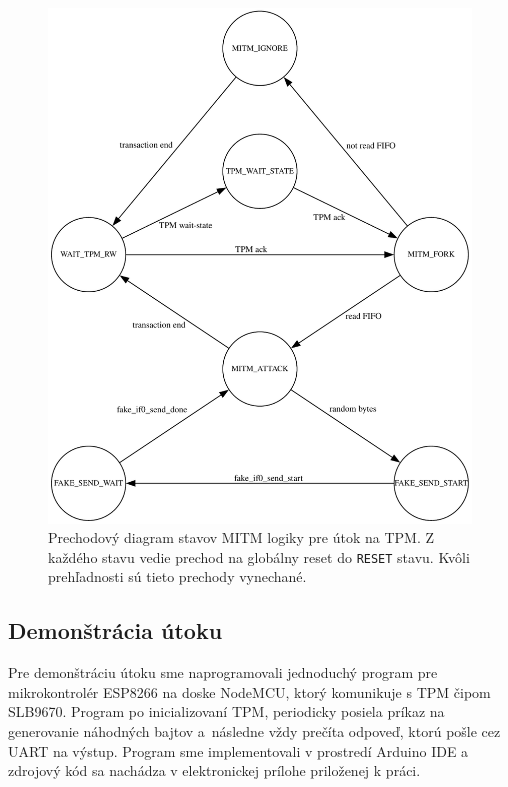 \begin{figure}
    \centerline{\includegraphics[width=1\textwidth]{images/misc/tpmMitmStateTransition.pdf}}
    \caption[Prechodový diagram stavov MITM logiky pre útok na TPM]{Prechodový diagram stavov MITM logiky pre útok na TPM. Z každého stavu vedie prechod na globálny reset do \texttt{RESET} stavu. Kvôli prehľadnosti sú tieto prechody vynechané.}
    \label{obr:tpmMitmStateTransition}
\end{figure}

\subsection{Demonštrácia útoku}
Pre demonštráciu útoku sme naprogramovali jednoduchý program pre mikrokontrolér ESP8266 na doske NodeMCU, ktorý komunikuje s TPM čipom SLB9670. Program po inicializovaní TPM, periodicky posiela príkaz na generovanie náhodných bajtov a~následne vždy prečíta odpoveď, ktorú pošle cez UART na výstup. Program sme implementovali v prostredí Arduino IDE a zdrojový kód sa nachádza v elektronickej prílohe priloženej k práci.

